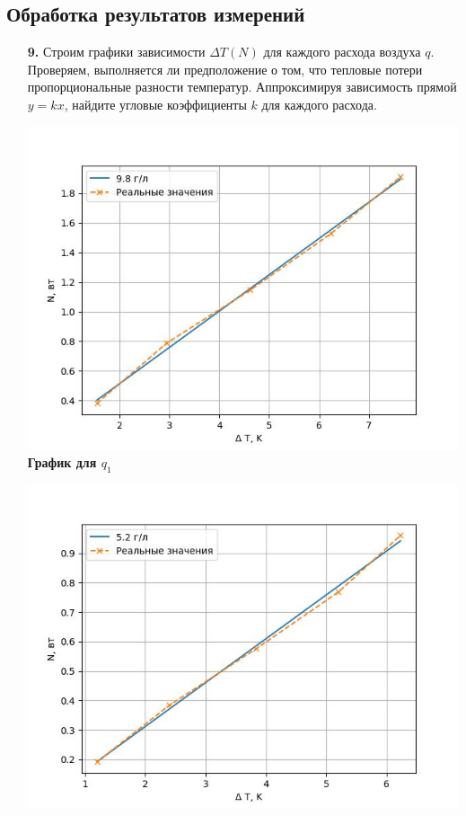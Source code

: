 \documentclass[a4paper, 12pt]{article}%
\begin{document}
\subsection*{Обработка результатов измерений}
\begin{enumerate}
\item [\textbf{9.}] Строим графики зависимости $\Delta T (N)$ для каждого расхода воздуха $q$. Проверяем, выполняется ли предположение о том, что тепловые потери пропорциональные разности температур. Аппроксимируя зависимость прямой $y = kx$, найдите угловые коэффициенты $k$ для каждого расхода.
\begin{center}
    \includegraphics[width = \textwidth]{211_3.jpg}
    \textbf{График для $q_1$}
  \end{center} 
  \begin{center} 
    \includegraphics[width = \textwidth]{211_4.jpg}

\end{center}
\end{enumerate}
\end{document}
